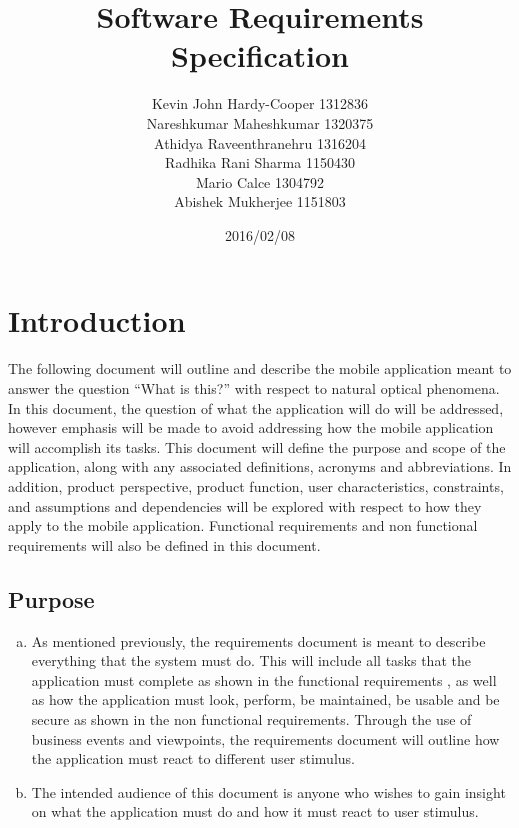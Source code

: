 \documentclass[]{article}
\begin{document}
\begin{titlepage}

\title{Software Requirements Specification}
\author{Kevin John Hardy-Cooper 1312836\\
		Nareshkumar Maheshkumar 1320375\\
		Athidya Raveenthranehru 1316204\\
		Radhika Rani Sharma	1150430\\
		Mario Calce 1304792\\
		Abishek Mukherjee 1151803 }
\date{2016/02/08}

\maketitle

\end{titlepage}
\tableofcontents                  \newpage    

	

\section{Introduction}
\label{sec:introduction}


The following document will outline and describe the mobile application meant to answer the question ``What is this?'' with respect to natural optical phenomena.  In this document, the question of what the application will do will be addressed, however emphasis will be made to avoid addressing how the mobile application will accomplish its tasks. This document will define the purpose and scope of the application, along with any associated definitions, acronyms and abbreviations. In addition, product perspective, product function, user characteristics, constraints, and assumptions and dependencies will be explored with respect to how they apply to the mobile application. Functional requirements and non functional requirements will also be defined in this document.

\subsection{Purpose}
\label{sub:purpose}
\begin{enumerate}[a)]
	\item As mentioned previously, the requirements document is meant to describe everything that the system must do. This will include all tasks that the application must complete as shown in the functional requirements , as well as how the application must look, perform, be maintained, be usable and be secure as shown in the non functional requirements. Through the use of business events and viewpoints, the requirements document will outline how the application must react to different user stimulus.
	\item The intended audience of this document is anyone who wishes to gain insight on what the application must do and how it must react to user stimulus.
\end{enumerate}
\end{document}
